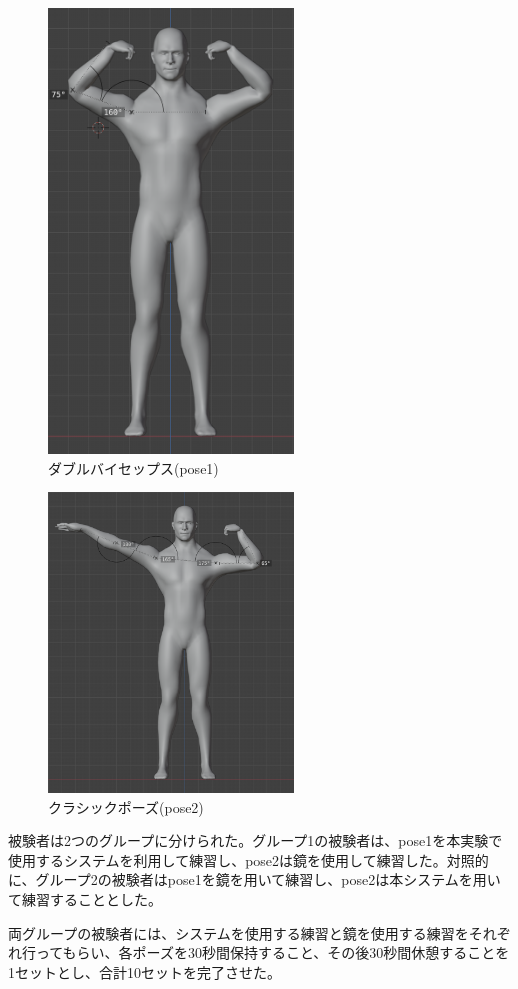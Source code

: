 \begin{figure}[H]
\begin{center}
\includegraphics[width=6.5cm]{figures/pose1.png}
\caption{ダブルバイセップス(pose1)}
\label{fig:pose1}
\end{center}
\end{figure}
\begin{figure}[H]
\begin{center}
\includegraphics[width=6.5cm]{figures/pose2.png}
\caption{クラシックポーズ(pose2)}
\label{fig:pose2}
\end{center}
\end{figure}

被験者は2つのグループに分けられた。グループ1の被験者は、pose1を本実験で使用するシステムを利用して練習し、pose2は鏡を使用して練習した。対照的に、グループ2の被験者はpose1を鏡を用いて練習し、pose2は本システムを用いて練習することとした。

両グループの被験者には、システムを使用する練習と鏡を使用する練習をそれぞれ行ってもらい、各ポーズを30秒間保持すること、その後30秒間休憩することを1セットとし、合計10セットを完了させた。